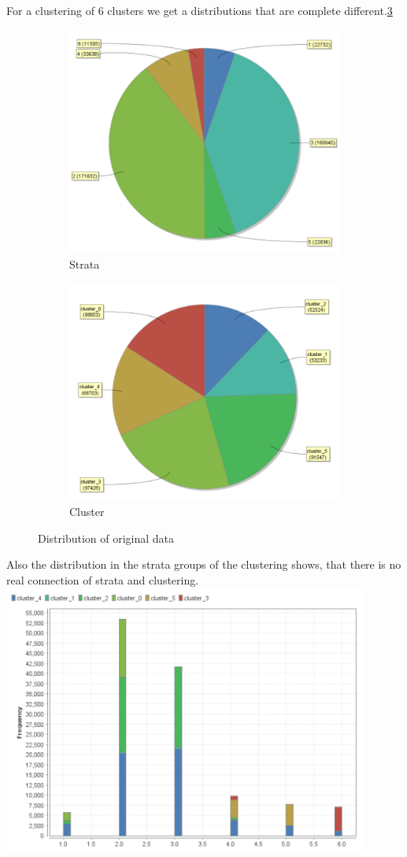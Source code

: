 For a clustering of 6 clusters we get a distributions that are complete different.\ref{fig:OrgDist}
\begin{figure}[h]
\centering
\begin{subfigure}{.5\textwidth}
  \centering
  \includegraphics[width=.4\linewidth]{ClusterOrigRapidStrata.PNG}
  \caption{Strata}
  \label{fig:OrgSt}
\end{subfigure}%
\begin{subfigure}{.5\textwidth}
  \centering
  \includegraphics[width=.4\linewidth]{ClusterOrigRapidCluster.PNG}
  \caption{Cluster}
  \label{fig:OrgCl}
\end{subfigure}
\caption{Distribution of original data}
\label{fig:OrgDist}
\end{figure}

Also the distribution in the strata groups of the clustering shows, that there is no real connection of strata and clustering.
\includegraphics[width=0.9\textwidth]{ClusterPCAOrigRapidDistribution.PNG}
